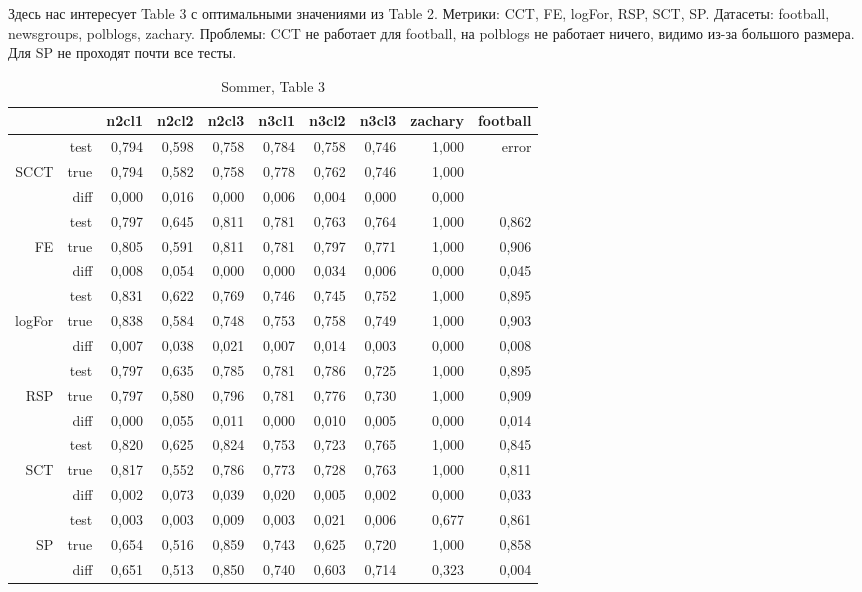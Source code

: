 \documentclass{article}
\begin{document}
Здесь нас интересует Table 3 с оптимальными значениями из Table 2.
Метрики: CCT, FE, logFor, RSP, SCT, SP.
Датасеты: football, newsgroups, polblogs, zachary.
Проблемы: CCT не работает для football, на polblogs не работает ничего, видимо из-за большого размера. Для SP не проходят почти все тесты.

\begin{table}[H]
\centering
\caption{Sommer, Table 3}
\label{my-label}
\begin{tabular}{rr|rrrrrrrr}
       &      & n2cl1 & n2cl2 & n2cl3 & n3cl1 & n3cl2 & n3cl3 & zachary & football \\
       \hline
       & test & 0,794 & 0,598 & 0,758 & 0,784 & 0,758 & 0,746 & 1,000   & \cellcolor{red!25} error    \\
SCCT   & true & 0,794 & 0,582 & 0,758 & 0,778 & 0,762 & 0,746 & 1,000   &          \\
       & diff & 0,000 & 0,016 & 0,000 & 0,006 & 0,004 & 0,000 & 0,000   &          \\
       \hline
       & test & 0,797 & 0,645 & 0,811 & 0,781 & 0,763 & 0,764 & 1,000   & 0,862    \\
FE     & true & 0,805 & 0,591 & 0,811 & 0,781 & 0,797 & 0,771 & 1,000   & 0,906    \\
       & diff & 0,008 & 0,054 & 0,000 & 0,000 & 0,034 & 0,006 & 0,000   & 0,045    \\
       \hline
       & test & 0,831 & 0,622 & 0,769 & 0,746 & 0,745 & 0,752 & 1,000   & 0,895    \\
logFor & true & 0,838 & 0,584 & 0,748 & 0,753 & 0,758 & 0,749 & 1,000   & 0,903    \\
       & diff & 0,007 & 0,038 & 0,021 & 0,007 & 0,014 & 0,003 & 0,000   & 0,008    \\
       \hline
       & test & 0,797 & 0,635 & 0,785 & 0,781 & 0,786 & 0,725 & 1,000   & 0,895    \\
RSP    & true & 0,797 & 0,580 & 0,796 & 0,781 & 0,776 & 0,730 & 1,000   & 0,909    \\
       & diff & 0,000 & 0,055 & 0,011 & 0,000 & 0,010 & 0,005 & 0,000   & 0,014    \\
       \hline
       & test & 0,820 & 0,625 & 0,824 & 0,753 & 0,723 & 0,765 & 1,000   & 0,845    \\
SCT    & true & 0,817 & 0,552 & 0,786 & 0,773 & 0,728 & 0,763 & 1,000   & 0,811    \\
       & diff & 0,002 & 0,073 & 0,039 & 0,020 & 0,005 & 0,002 & 0,000   & 0,033    \\
       \hline
       & test & 0,003 & 0,003 & 0,009 & 0,003 & 0,021 & 0,006 & 0,677   & 0,861    \\
SP     & true & 0,654 & 0,516 & 0,859 & 0,743 & 0,625 & 0,720 & 1,000   & 0,858    \\
       & diff & \cellcolor{red!25} 0,651 & \cellcolor{red!25} 0,513 & \cellcolor{red!25} 0,850 &
                    \cellcolor{red!25} 0,740 & \cellcolor{red!25} 0,603 & \cellcolor{red!25} 0,714 & \cellcolor{yellow!25} 0,323   & 0,004   
\end{tabular}
\end{table}
\end{document}
